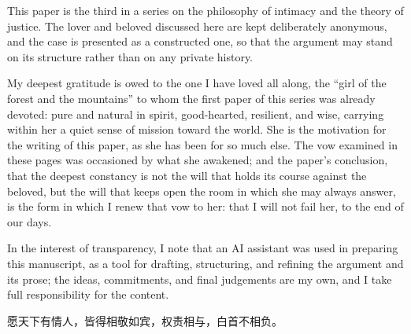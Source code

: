 \documentclass[11pt,a4paper]{article}
\begin{document}
This paper is the third in a series on the philosophy of intimacy and the theory of justice. The lover and beloved discussed here are kept deliberately anonymous, and the case is presented as a constructed one, so that the argument may stand on its structure rather than on any private history.

My deepest gratitude is owed to the one I have loved all along, the ``girl of the forest and the mountains'' to whom the first paper of this series was already devoted: pure and natural in spirit, good-hearted, resilient, and wise, carrying within her a quiet sense of mission toward the world. She is the motivation for the writing of this paper, as she has been for so much else. The vow examined in these pages was occasioned by what she awakened; and the paper's conclusion, that the deepest constancy is not the will that holds its course against the beloved, but the will that keeps open the room in which she may always answer, is the form in which I renew that vow to her: that I will not fail her, to the end of our days.

In the interest of transparency, I note that an AI assistant was used in preparing this manuscript, as a tool for drafting, structuring, and refining the argument and its prose; the ideas, commitments, and final judgements are my own, and I take full responsibility for the content.

\begin{center}
{\cjkfont\color{rosedeep} 愿天下有情人，皆得相敬如宾，权责相与，白首不相负。}
\end{center}

\printbibliography[heading=bibintoc]
\end{document}
